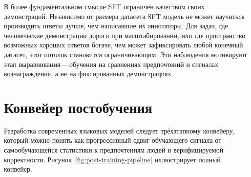В более фундаментальном смысле SFT ограничен качеством своих демонстраций. Независимо от размера датасета SFT модель не может научиться производить ответы лучше, чем написавшие их аннотаторы. Для задач, где человеческие демонстрации дороги при масштабировании, или где пространство возможных хороших ответов богаче, чем может зафиксировать любой конечный датасет, этот потолок становится ограничивающим. Эти наблюдения мотивируют этап выравнивания\,---\,обучения на сравнениях предпочтений и сигналах вознаграждения, а не на фиксированных демонстрациях.

\section{Конвейер постобучения}
\label{sec:post-training-pipeline}

Разработка современных языковых моделей следует трёхэтапному конвейеру, который можно понять как прогрессивный сдвиг обучающего сигнала от самообучающейся статистики к предпочтениям людей и верифицируемой корректности. Рисунок~\ref{fig:post-training-pipeline} иллюстрирует полный конвейер.

